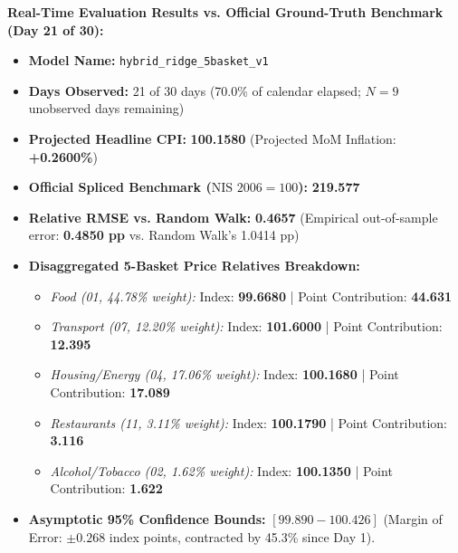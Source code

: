 \documentclass[11pt,a4paper,oneside]{article}
\begin{document}
\begin{tcolorbox}[colback=white,colframe=AccentGreen,title=\textbf{Live Production Validation: September 21, 2026 Nowcast Audit}]
\textbf{Real-Time Evaluation Results vs. Official Ground-Truth Benchmark (Day 21 of 30):}
\begin{itemize}[noitemsep]
    \item \textbf{Model Name:} \texttt{hybrid\_ridge\_5basket\_v1}
    \item \textbf{Days Observed:} 21 of 30 days (70.0\% of calendar elapsed; $N = 9$ unobserved days remaining)
    \item \textbf{Projected Headline CPI:} \textbf{100.1580} (Projected MoM Inflation: \textbf{+0.2600\%})
    \item \textbf{Official Spliced Benchmark ($\text{NIS } 2006=100$):} \textbf{219.577}
    \item \textbf{Relative RMSE vs. Random Walk:} \textbf{0.4657} (Empirical out-of-sample error: \textbf{0.4850 pp} vs. Random Walk's 1.0414 pp)
    \item \textbf{Disaggregated 5-Basket Price Relatives Breakdown:}
    \begin{itemize}[noitemsep]
        \item \textit{Food (01, 44.78\% weight):} Index: \textbf{99.6680} | Point Contribution: \textbf{44.631}
        \item \textit{Transport (07, 12.20\% weight):} Index: \textbf{101.6000} | Point Contribution: \textbf{12.395}
        \item \textit{Housing/Energy (04, 17.06\% weight):} Index: \textbf{100.1680} | Point Contribution: \textbf{17.089}
        \item \textit{Restaurants (11, 3.11\% weight):} Index: \textbf{100.1790} | Point Contribution: \textbf{3.116}
        \item \textit{Alcohol/Tobacco (02, 1.62\% weight):} Index: \textbf{100.1350} | Point Contribution: \textbf{1.622}
    \end{itemize}
    \item \textbf{Asymptotic 95\% Confidence Bounds:} $[99.890 - 100.426]$ (Margin of Error: $\pm 0.268$ index points, contracted by 45.3\% since Day 1).
\end{itemize}
\end{tcolorbox}

\vspace{1.0cm}
\end{document}
